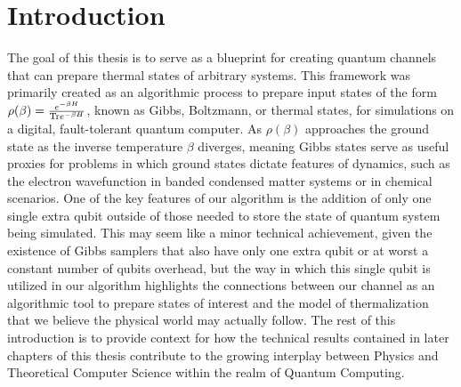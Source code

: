 \chapter{Introduction}
The goal of this thesis is to serve as a blueprint for creating quantum channels that can prepare thermal states of arbitrary systems. This framework was primarily created as an algorithmic process to prepare input states of the form $\rho(\beta) = \frac{e^{-\beta H}}{{\rm Tr} e^{-\beta H}}$, known as Gibbs, Boltzmann, or thermal states, for simulations on a digital, fault-tolerant quantum computer. As $\rho(\beta)$ approaches the ground state as the inverse temperature $\beta$ diverges, meaning Gibbs states serve as useful proxies for problems in which ground states dictate features of dynamics, such as the electron wavefunction in banded condensed matter systems or in chemical scenarios. One of the key features of our algorithm is the addition of only one single extra qubit outside of those needed to store the state of quantum system being simulated. This may seem like a minor technical achievement, given the existence of Gibbs samplers that also have only one extra qubit or at worst a constant number of qubits overhead, but the way in which this single qubit is utilized in our algorithm highlights the connections between our channel as an algorithmic tool to prepare states of interest and the model of thermalization that we believe the physical world may actually follow. The rest of this introduction is to provide context for how the technical results contained in later chapters of this thesis contribute to the growing interplay between Physics and Theoretical Computer Science within the realm of Quantum Computing.

